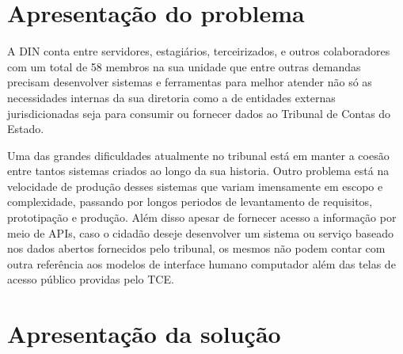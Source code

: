 \section{Apresentação do problema }

  A DIN conta entre servidores, estagiários, terceirizados, e outros colaboradores com um total de 58 membros na sua unidade \cite{relatorio_trimestral} que entre outras demandas precisam desenvolver sistemas e ferramentas para melhor atender não só as necessidades internas da sua diretoria como a de entidades externas jurisdicionadas seja para consumir ou fornecer dados ao Tribunal de Contas do Estado.

  Uma das grandes dificuldades atualmente no tribunal está em manter a coesão entre tantos sistemas criados ao longo da sua historia. Outro problema está na velocidade de produção desses sistemas que variam imensamente em escopo e complexidade, passando por longos periodos de levantamento de requisitos, prototipação e produção. Além disso apesar de fornecer acesso a informação por meio de APIs, caso o cidadão deseje desenvolver um sistema ou serviço baseado nos dados abertos fornecidos pelo tribunal, os mesmos não podem contar com outra referência aos modelos de interface humano computador além das telas de acesso público providas pelo TCE.



\section{Apresentação da solução }

